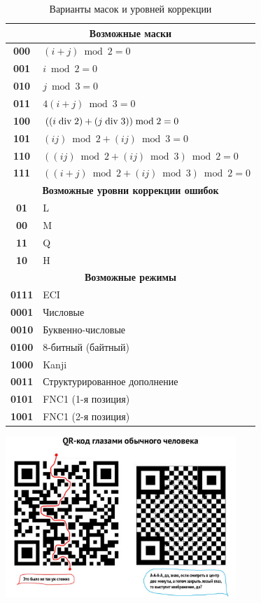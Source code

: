 \documentclass[final,pdftex]{../../template/epsilonj}
\newcommand{\mydiv}{\nonscript \mskip -\medmuskip \mkern 5mu \mathbin {\rm div}\penalty 900\mkern 5mu\nonscript \mskip -\medmuskip}
\begin{document}
\begin{table}[hbtp]
\centering
\begin{tabular}{||c|l||}
\hline 
\multicolumn{2}{|c|}{\bf Возможные маски}\\ 
\hline
{\bf 000} & $(i + j) \bmod 2 = 0$ \\
{\bf 001} & $i \bmod 2 = 0$ \\
{\bf 010}	& $j \bmod 3 = 0$ \\
{\bf 011}	& $4(i + j) \bmod 3 = 0$ \\
{\bf 100}	& $((i \mydiv 2) + (j \mydiv 3)) \bmod 2 = 0$ \\
{\bf 101}	& $(i j) \bmod 2 + (i j) \bmod 3 = 0$ \\
{\bf 110}	& $((i j) \bmod 2 + (i j) \bmod 3) \bmod 2 = 0$ \\
{\bf 111}	& $((i+j) \bmod 2 + (i j) \bmod 3) \bmod 2 = 0$ \\
\hline 
\multicolumn{2}{|c|}{\bf Возможные уровни коррекции ошибок}\\  
\hline
{\bf  01} & L\\
{\bf  00} & M\\
{\bf  11} & Q\\
{\bf  10} & H\\
\hline
\multicolumn{2}{|c|}{\bf Возможные режимы}\\  
\hline
{\bf  0111} & ECI\\
{\bf  0001} & Числовые\\
{\bf  0010} & Буквенно-числовые\\
{\bf  0100} & 8-битный (байтный)\\
{\bf  1000} & Kanji\\
{\bf  0011} & Структурированное дополнение\\
{\bf  0101} & FNC1 (1-я позиция)\\
{\bf  1001} & FNC1 (2-я позиция)\\
\hline
\end{tabular}
\caption{Варианты масок и уровней коррекции} \label{tab:mlt}
\end{table}

\printbibliography

\begin{center}
\includegraphics[width=87mm]{qr.jpg} 
\end{center}
\end{document}
